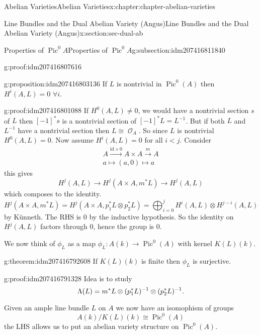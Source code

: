 \documentclass[oneside,10pt,]{book}
\newcommand{\qedhere}{\relax}
\numberwithin{equation}{section}
\newcommand{\sheaf}[1]{\operatorname{\mathcal{#1}}}
\newcommand{\lb}{[}
\newcommand{\rb}{]}
\newcommand{\id}{\mathrm{id}}
\DeclareMathOperator{\Pic}{Pic}
\newcommand{\lt}{<}
\begin{document}
\begin{chapterptx}{Abelian Varieties}{}{Abelian Varieties}{}{}{x:chapter:chapter-abelian-varieties}
\begin{sectionptx}{Line Bundles and the Dual Abelian Variety (Angus)}{}{Line Bundles and the Dual Abelian Variety (Angus)}{}{}{x:section:sec-dual-ab}
\begin{subsectionptx}{Properties of \(\Pic^0 A\)}{}{Properties of \(\Pic^0 A\)}{}{}{g:subsection:idm207416811840}
\begin{proofptx}{}{g:proof:idm207416807616}
\end{proofptx}
\begin{proposition}{}{}{g:proposition:idm207416803136}%
If \(L\) is nontrivial in \(\Pic^0(A)\) then \(H^i(A,L) = 0\) \(\forall i\).%
\end{proposition}
\begin{proofptx}{}{g:proof:idm207416801088}
If \(H^0(A,L) \ne 0\), we would have  a nontrivial section \(s\) of \(L\) then \(\lb -1\rb ^* s\) is   a nontrivial section of \(\lb-1\rb^* L = L^{-1}\). But if both \(L\) and \(L^{-1}\) have  a nontrivial section then \(L \cong \sheaf O_A\). So since \(L\) is nontrivial \(H^0(A,L) = 0\). Now assume \(H^i(A,L) = 0\) for all \(i\lt j\). Consider%
\begin{gather*}
A\xrightarrow{\id \times 0} A\times A \xrightarrow m A\\
a\mapsto (a,0)\mapsto a
\end{gather*}
this gives%
\begin{equation*}
H^j(A, L) \to H^j(A\times A, m^*L) \to H^j(A,L)
\end{equation*}
which composes to the identity.%
\begin{equation*}
H^j(A\times A, m^*L) =  H^j(A\times A, p_1^*L \otimes p_2^*L) = \bigoplus_{i=0}^j H^i(A,L) \otimes H^{j-i}(A,L)
\end{equation*}
by Künneth. The RHS is 0 by the inductive hypothesis. So the identity on \(H^j(A,L)\) factors through 0, hence the group is 0.%
\end{proofptx}
We now think of \(\phi_L\) as a map \(\phi_L \colon A(k) \to \Pic^0(A)\) with kernel \(K(L) (k)\).%
\begin{theorem}{}{}{g:theorem:idm207416792608}%
If \(K(L)(k)\) is finite then \(\phi_L\) is surjective.%
\end{theorem}
\begin{proofptx}{}{g:proof:idm207416791328}
Idea is to study%
\begin{equation*}
\Lambda (L) =  m^* L \otimes (p_1^* L)^{-1} \otimes (p_2^* L)^{-1}\text{.}\qedhere
\end{equation*}
%
\end{proofptx}
Given an ample line bundle \(L\) on \(A\) we now have an isomophism of groups%
\begin{equation*}
A(k)/K(L)(k) \cong \Pic^0(A)
\end{equation*}
the LHS allows us to put an abelian variety structure on \(\Pic^0(A)\).%
\end{subsectionptx}
%
%
\typeout{************************************************}

\end{sectionptx}
\end{chapterptx}
\end{document}
